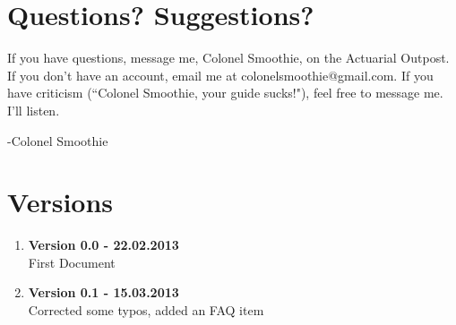 \documentclass[oneside, titlepage]{article}
\begin{document}
\begin{enumerate}
\end{enumerate}

\section{Questions? Suggestions?}
If you have questions, message me, Colonel Smoothie, on the Actuarial Outpost. If you don't have an account, email me at colonelsmoothie@gmail.com. If you have criticism (``Colonel Smoothie, your guide sucks!"), feel free to message me. I'll listen.

-Colonel Smoothie

\section{Versions}
\begin{enumerate}
\item{\bfseries Version 0.0 - 22.02.2013}\\
First Document
\item{\bfseries Version 0.1 - 15.03.2013}\\
Corrected some typos, added an FAQ item
\end{enumerate}
\end{document}
